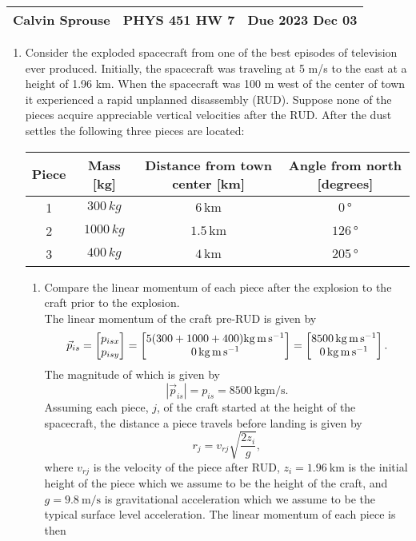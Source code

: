 \documentclass[a4paper, 12pt]{config/homework}
\begin{document}
\noindent
\begin{tabularx}{\textwidth}{>{\centering\arraybackslash}X>{\centering\arraybackslash}X>{\centering\arraybackslash}X}
Calvin Sprouse & PHYS 451 HW 7 & Due 2023 Dec 03\\
\midrule
\end{tabularx}

\begin{enumerate}
\item Consider the exploded spacecraft from one of the best episodes of television ever produced. Initially, the spacecraft was traveling at 5 m/s to the east at a height of 1.96 km. When the spacecraft was 100 m west of the center of town it experienced a rapid unplanned disassembly (RUD). Suppose none of the pieces acquire appreciable vertical velocities after the RUD.
After the dust settles the following three pieces are located:
\begin{table}[h]
    \centering
    \begin{tabular}{cccc}
    Piece & Mass [kg] & Distance from town center [km] & Angle from north [degrees] \\ \midrule
    1 & \(300\,\unit{kg}\) & \(6\, \unit{\kilo\meter}\) & \(0\, \unit{\degree}\) \\
    2 & \(1000\, \unit{kg}\) & \(1.5\, \unit{\kilo\meter}\) & \(126\, \unit{\degree}\) \\
    3 & \(400\, \unit{kg}\) & \(4\, \unit{\kilo\meter}\) & \(205\, \unit{\degree}\)
    \end{tabular}
    \end{table}
\begin{enumerate}[label=\Alph*.]
\item Compare the linear momentum of each piece after the explosion to the craft prior to the explosion.
\\ The linear momentum of the craft pre-RUD is given by
\[\vec{p}_{is} = \matr{p_{isx} \\ p_{isy}} = \matr{5(300+1000+400) \unit{\kg\meter\per\second} \\ 0\,\unit{\kg\meter\per\second}} = \matr{\qty{8500}{\kg\meter\per\second} \\ 0\,\unit{\kg\meter\per\second}}.\]
The magnitude of which is given by
\[|\vec{p}_{is}| = p_{is} = \qty{8500}{\kg\meter\per\second}.\]
Assuming each piece, \(j\), of the craft started at the height of the spacecraft, the distance a piece travels before landing is given by
\[r_j = v_{rj}\sqrt{\frac{2 z_i}{g}},\]
where \(v_{rj}\) is the velocity of the piece after RUD, \(z_i=\qty{1.96}{\kilo\meter}\) is the initial height of the piece which we assume to be the height of the craft, and \\ \( g = \qty{9.8}{\meter\per\second} \) is gravitational acceleration which we assume to be the typical surface level acceleration. The linear momentum of each piece is then

\end{enumerate}
\end{enumerate}
\end{document}

